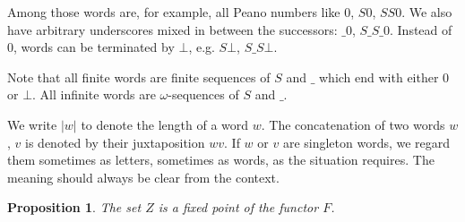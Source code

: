 \documentclass[a4paper]{article}
\newtheorem{thmDomNuFisFixedPoint}[defNuF]{Proposition}
\begin{document}
Among those words are, for example, all Peano numbers like $0$, $S0$, $SS0$.
We also have arbitrary underscores mixed in between the successors: $\_0$,
$S\_S\_0$.  Instead of $0$, words can be terminated by $\bot$, e.g.  $S\bot$,
$S\_S\bot$.

Note that all finite words are finite sequences of $S$ and $\_$ which end with
either $0$ or $\bot$. All infinite words are $\omega$-sequences of $S$ and $\_$.

We write $|w|$ to denote the length of a word $w$.  The concatenation of two
words $w$, $v$ is denoted by their juxtaposition $wv$.  If $w$ or $v$ are
singleton words, we regard them sometimes as letters, sometimes as words, as the
situation requires.  The meaning should always be clear from the context.

\begin{thmDomNuFisFixedPoint}

The set $Z$ is a fixed point of the functor $F$.

\end{thmDomNuFisFixedPoint}
\end{document}
